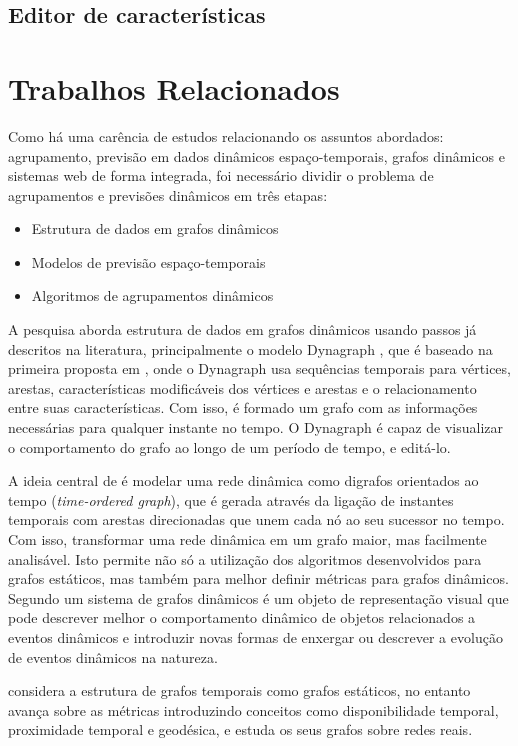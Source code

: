 \subsection{Editor de características}
\section{Trabalhos Relacionados}

Como há uma carência de estudos relacionando os assuntos abordados: agrupamento,
previsão em dados dinâmicos espaço-temporais, grafos dinâmicos e sistemas web
de forma integrada, foi necessário dividir o problema de agrupamentos e previsões dinâmicos em três etapas:
\begin{itemize}
\item Estrutura de dados em grafos dinâmicos
\item Modelos de previsão espaço-temporais
\item Algoritmos de agrupamentos dinâmicos
\end{itemize}

A pesquisa aborda estrutura de dados em grafos dinâmicos usando passos já descritos na literatura,
principalmente o modelo Dynagraph \cite{dynagraph}, que é baseado na primeira proposta
em \cite{dynagraph2012}, onde o Dynagraph usa sequências temporais para vértices, arestas,
características modificáveis dos vértices e arestas e o relacionamento entre suas características.
Com isso, é formado um grafo com as informações necessárias para qualquer instante no tempo.
O Dynagraph é capaz de visualizar o comportamento do grafo ao longo de um período de tempo,
e editá-lo.

A ideia central de \cite{kim} é modelar uma rede dinâmica como digrafos orientados ao
tempo (\textit{time-ordered graph}), que é gerada através da ligação de instantes temporais com arestas
direcionadas que unem cada nó ao seu sucessor no tempo. Com isso, transformar uma rede dinâmica
em um grafo maior, mas facilmente analisável. Isto permite não só a utilização dos algoritmos 
desenvolvidos para grafos estáticos, mas também para melhor definir métricas para grafos dinâmicos.
Segundo \cite{kim} um sistema de grafos dinâmicos é um objeto de representação visual
que pode descrever melhor o comportamento dinâmico de objetos relacionados a eventos dinâmicos e
introduzir novas formas de enxergar ou descrever a evolução de eventos dinâmicos na natureza.

\cite{kostakos} considera a estrutura de grafos temporais como grafos
estáticos, no entanto avança sobre as métricas introduzindo conceitos como disponibilidade
temporal, proximidade temporal e geodésica, e estuda os seus grafos sobre redes reais.

